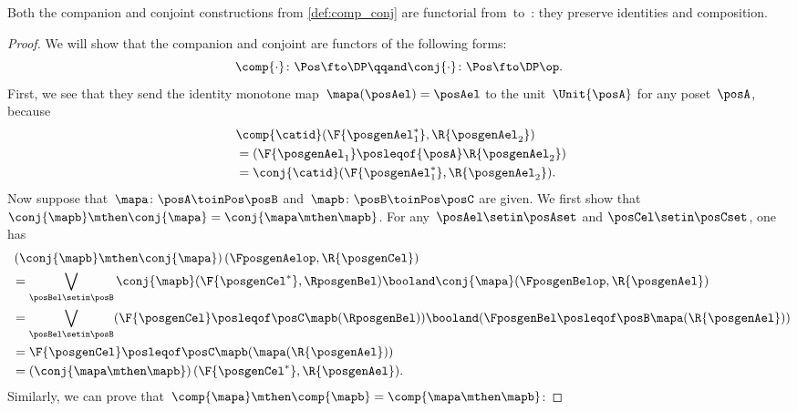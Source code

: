\begin{lemma}
    \label{lem:comp_conj}
    Both the companion and conjoint constructions from \cref{def:comp_conj} are functorial from~\Pos to~\DP: they preserve identities and composition.
\end{lemma}
\begin{proof}
    We will show that the companion and conjoint are functors of the following forms:
    \begin{equation}
        \comp{\cdot}\colon\Pos\fto\DP
        \qqand
        \conj{\cdot}\colon\Pos\fto\DP\op.
    \end{equation}
    First, we see that they send the identity monotone map~$\mapa(\posAel)=\posAel$ to the unit~$\Unit{\posA }$ for any poset~$\posA$, because
    \begin{equation}
        \begin{aligned}
            ~ & \comp{\catid}(\F{\posgenAel_1^*},\R{\posgenAel_2}) \\
              & = (\F{\posgenAel_1} \posleqof{\posA} \R{\posgenAel_2}) \\
              & =\conj{\catid}(\F{\posgenAel_1^*},\R{\posgenAel_2}).
        \end{aligned}
    \end{equation}
    Now suppose that~$\mapa\colon  \posA \toinPos \posB $ and~$\mapb\colon \posB \toinPos \posC$ are given.
    We first show that $\conj{\mapb}\mthen\conj{\mapa}=\conj{\mapa\mthen \mapb}$.
    For any~$\posAel\setin \posAset$ and $\posCel\setin \posCset$, one has
    \begin{equation}
        \begin{aligned}
            ~ & \left(\conj{\mapb}\mthen \conj{\mapa}\right)(\FposgenAelop,\R{\posgenCel}) \\
              & =\bigvee_{\posBel\setin \posB} \conj{\mapb}(\F{\posgenCel^*},\RposgenBel)\booland\conj{\mapa}(\FposgenBelop,\R{\posgenAel}) \\
              & =\bigvee_{\posBel\setin \posB} (\F{\posgenCel}\posleqof\posC \mapb(\RposgenBel)) \booland (\FposgenBel\posleqof\posB \mapa(\R{\posgenAel})) \\
              & = \F{\posgenCel}\posleqof\posC \mapb(\mapa(\R{\posgenAel})) \\
              & =\left(\conj{\mapa\mthen \mapb}\right)(\F{\posgenCel^*},\R{\posgenAel}).
        \end{aligned}
    \end{equation}
    Similarly, we can prove that~$\comp{\mapa}\mthen \comp{\mapb}=\comp{\mapa\mthen \mapb}$:

\end{proof}

